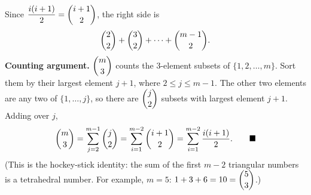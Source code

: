 Since $\dfrac{i(i+1)}{2}=\dbinom{i+1}{2}$, the right side is
\[\dbinom22+\dbinom32+\cdots+\dbinom{m-1}{2}.\]
\textbf{Counting argument.} $\dbinom m3$ counts the $3$-element subsets of $\{1,2,\dots,m\}$. Sort them by their largest element $j+1$, where $2\le j\le m-1$. The other two elements are any two of $\{1,\dots,j\}$, so there are $\dbinom j2$ subsets with largest element $j+1$. Adding over $j$,
\[\dbinom m3=\sum_{j=2}^{m-1}\dbinom j2=\sum_{i=1}^{m-2}\dbinom{i+1}{2}=\sum_{i=1}^{m-2}\dfrac{i(i+1)}{2}.\qquad\blacksquare\]
(This is the hockey-stick identity: the sum of the first $m-2$ triangular numbers is a tetrahedral number. For example, $m=5$: $1+3+6=10=\dbinom53$.)
